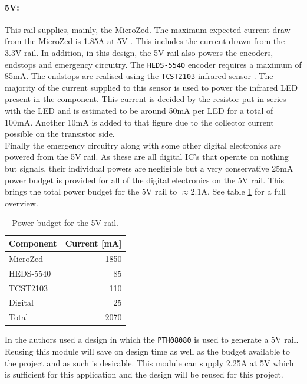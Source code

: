 \paragraph{5V:} %
\label{par:5v}
This rail supplies, mainly, the MicroZed.
The maximum expected current draw from the MicroZed is 1.85A at 5V \cite{microzed}.
This includes the current drawn from the 3.3V rail.
In addition, in this design, the 5V rail also powers the encoders, endstops and emergency circuitry.
The \texttt{HEDS-5540} \cite{heds5540} encoder requires a maximum of 85mA.
The endstops are realised using the \texttt{TCST2103} infrared sensor \cite{tcst2103}.
The majority of the current supplied to this sensor is used to power the infrared LED present in the component.
This current is decided by the resistor put in series with the LED and is estimated to be around 50mA per LED for a total of 100mA.
Another 10mA is added to that figure due to the collector current possible on the transistor side.\\
Finally the emergency circuitry along with some other digital electronics are powered from the 5V rail.
As these are all digital IC's that operate on nothing but signals, their individual powers are negligible but a very conservative 25mA power budget is provided for all of the digital electronics on the 5V rail. This brings the total power budget for the 5V rail to $\approx$2.1A.
See table \ref{tab:5vpowerbudget} for a full overview.

\begin{table}
	\centering
	\begin{tabular}{l|r}
		 Component & Current [mA]\\
		 \hline
		 MicroZed & 1850\\
		 HEDS-5540 & 85\\
		 TCST2103 & 110\\
		 Digital & 25\\
		 \hline
		 Total & 2070
	\end{tabular}
	\caption{Power budget for the 5V rail.}
	\label{tab:5vpowerbudget}
\end{table}

In \cite{isaswarm} the authors used a design in which the \texttt{PTH08080} is used to generate a 5V rail.
Reusing this module will save on design time as well as the budget available to the project and as such is desirable.
This module can supply 2.25A at 5V which is sufficient for this application and the design will be reused for this project.

